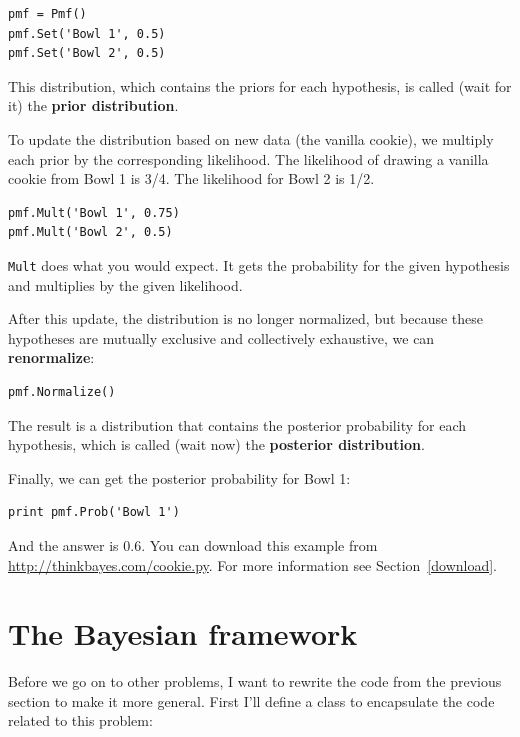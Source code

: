 \documentclass[12pt]{book}
\begin{document}
\begin{verbatim}
pmf = Pmf()
pmf.Set('Bowl 1', 0.5)
pmf.Set('Bowl 2', 0.5)
\end{verbatim}

This distribution, which contains the priors for each hypothesis,
is called (wait for it) the {\bf prior distribution}.

To update the distribution based on new data (the vanilla cookie),
we multiply each prior by the corresponding likelihood.  The likelihood
of drawing a vanilla cookie from Bowl 1 is 3/4.  The likelihood
for Bowl 2 is 1/2.

\begin{verbatim}
pmf.Mult('Bowl 1', 0.75)
pmf.Mult('Bowl 2', 0.5)
\end{verbatim}

\verb"Mult" does what you would expect.  It gets the probability
for the given hypothesis and multiplies by the given likelihood.

After this update, the distribution is no longer normalized, but
because these hypotheses are mutually exclusive and collectively
exhaustive, we can {\bf renormalize}:

\begin{verbatim}
pmf.Normalize()
\end{verbatim}

The result is a distribution that contains the posterior probability
for each hypothesis, which is called (wait now) the
{\bf posterior distribution}.

Finally, we can get the posterior probability for Bowl 1:

\begin{verbatim}
print pmf.Prob('Bowl 1')
\end{verbatim}

And the answer is 0.6.  You can download this example
from \url{http://thinkbayes.com/cookie.py}.  For more information
see Section~\ref{download}.


\section{The Bayesian framework}
\label{framework}

Before we go on to other problems, I want to rewrite the code
from the previous section to make it more general.  First I'll
define a class to encapsulate the code related to this problem:
\end{document}
